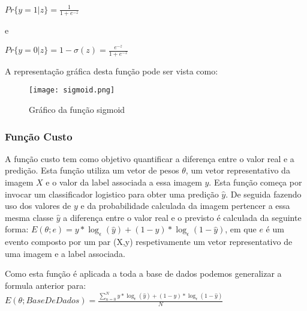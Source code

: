 $Pr\{y = 1|z\} = \frac{1}{1+e^{-z}}$\newline

e \newline

$Pr\{y = 0|z\} = 1 - \sigma(z) = \frac{e^{-z}}{1+e^{-z}}$\newline


A representação gráfica desta função pode ser vista como:

\begin{figure}[H]

  \centering
  \captionsetup{justification=centering}

  \texttt{[image: sigmoid.png]}
  
  \caption {Gráfico da função sigmoid}

\end{figure}



\subsubsection{Função Custo}\hfill\newline
\hfill\newline

A função custo tem como objetivo quantificar a diferença entre o valor real e a predição. Esta função utiliza um vetor de pesos $\theta$, um vetor representativo da imagem $X$ e o valor da label associada a essa imagem $y$. Esta função começa por invocar um classificador logistico para obter uma predição $\hat{y}$. De seguida fazendo uso dos valores de $y$ e da probabilidade calculada da imagem pertencer a essa mesma classe $\hat{y}$ a diferença entre o valor real e o previsto é calculada da seguinte forma:
\hfill\newline
\hfill\newline
$E(\theta; e) = y*{\log_\epsilon (\hat{y})}+(1-y)*{\log_\epsilon (1-\hat{y})}$, em que $e$ é um evento composto por um par (X,y) respetivamente um vetor representativo de uma imagem e a label associada.

\hfill\newline
\hfill\newline
Como esta função é aplicada a toda a base de dados podemos generalizar a formula anterior para: 
\hfill\newline
\hfill\newline
$E(\theta; Base De Dados) = \frac{\sum_{n=0}^{N} y*{\log_\epsilon (\hat{y})}+(1-y)*{\log_\epsilon (1-\hat{y})}}{N}$

